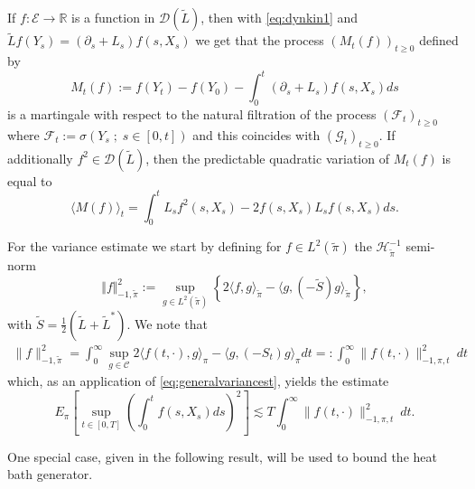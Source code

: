 \documentclass[a4paper, reqno, 12pt]{amsart}
\theoremstyle{plain}
\theoremstyle{definition}
\begin{document}
If $f: \mathcal E\to\mathbb R$ is a function in  $\mathcal D(\tilde L)$, then with \eqref{eq:dynkin1} and $\tilde Lf(Y_s) = (\partial_s +L_s)f(s,X_s)$ we get that the process $(M_t (f))_{t \ge 0}$ defined by
\begin{equation} \label{eq:dynkin1inhom}
    M_t(f) := f(Y_t) - f(Y_0) - \int_0^t   (\partial_s + L_s)f(s,X_s) ds
\end{equation}
is a martingale with respect to the natural filtration of the process $(\mathcal F_t)_{t\ge 0}$ where $\mathcal F_t:=\sigma(Y_s\; ; \;  s\in[0,t])$ and this coincides with $(\mathcal G_t)_{t\ge 0}$. If additionally $f^2\in \mathcal D(\tilde L)$, then the  predictable quadratic variation of $M_t(f)$ is equal to 
\begin{equation} \label{eq:dynkin2inhom}
    \langle M(f)\rangle_t= \int_0^t L_sf^2(s,X_s) - 2 f(s,X_s)L_sf(s,X_s) ds.
\end{equation}

For the variance estimate we start by defining for $f \in L^2 (\tilde\pi)$ the $\mathcal H^{-1}_{\tilde \pi}$ semi-norm 
\begin{equation}
\Vert f \Vert_{-1,\tilde\pi}^2 := \sup_{g \in L^2(\tilde\pi)} \left\{ 2 \langle f, g\rangle_{\tilde\pi} - \langle g , (-\tilde S) g \rangle_{\tilde\pi} \right\},
\end{equation}
with $\tilde S =\tfrac{1}{2} (\tilde L + \tilde L^{\ast})$. We note that
\begin{align*}
    \|f\|^2_{-1,\tilde\pi} = \int_0^{\infty} \sup_{{g\in\mathcal C}} 2\langle f(t,\cdot),g\rangle_{\pi} -\langle g,(-S_t)g\rangle_{\pi} dt =: \int_0^{\infty} \|f(t,\cdot)\|_{-1,\pi,t}^2\ dt
\end{align*}
which, as an application of \eqref{eq:generalvariancest}, yields the estimate
\begin{equation}\label{eq:inhomvariance} 
 E_{\pi}\left[ \sup_{t\in[0,T]} \left( \int_0^t f(s,X_s) ds \right)^2 \right] \lesssim T\int_0^{\infty}\|f(t,\cdot)\|^2_{-1,\pi,t}\  dt.
\end{equation}

One special case, given in the following result, will be used to bound the heat bath generator.
\end{document}
